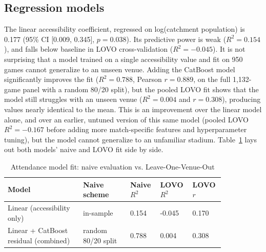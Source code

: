 \documentclass[9pt,twoside]{pnas-new}
\begin{document}
\subsection{Regression models}
The linear accessibility coefficient, regressed on log(catchment population) is 0.177 (95\% CI [0.009, 0.345], $p=0.038$). Its predictive power is weak ($R^2=0.154$), and falls below baseline in LOVO cross-validation ($R^2=-0.045$). It is not surprising that a model trained on a single accessibility value and fit on 950 games cannot generalize to an unseen venue. Adding the CatBoost model significantly improves the fit ($R^2=0.788$, Pearson $r=0.889$, on the full 1,132-game panel with a random 80/20 split), but the pooled LOVO fit shows that the model still struggles with an unseen venue ($R^2=0.004$ and $r=0.308$), producing values nearly identical to the mean. This is an improvement over the linear model alone, and over an earlier, untuned version of this same model (pooled LOVO $R^2=-0.167$ before adding more match-specific features and hyperparameter tuning), but the model cannot generalize to an unfamiliar stadium. Table~\ref{tab:fit} lays out both models' naive and LOVO fit side by side.

\begin{table}[h!]
\centering
\caption{Attendance model fit: naive evaluation vs. Leave-One-Venue-Out}
\begin{tabular}{@{}p{0.32\linewidth}p{0.2\linewidth}p{0.11\linewidth}p{0.11\linewidth}p{0.1\linewidth}@{}}
\toprule
Model & Naive scheme & Naive $R^2$ & LOVO $R^2$ & LOVO $r$ \\
\midrule
Linear (accessibility only) & in-sample & 0.154 & -0.045 & 0.170 \\
Linear + CatBoost residual (combined) & random 80/20 split & 0.788 & 0.004 & 0.308 \\
\bottomrule
\end{tabular}
\label{tab:fit}
\end{table}
\end{document}
